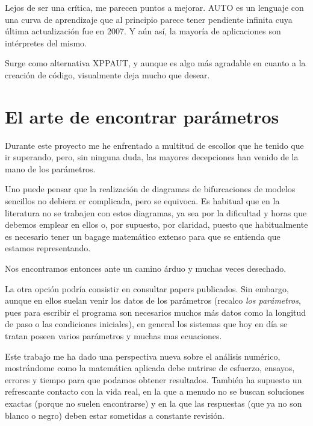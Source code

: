 Lejos de ser una crítica, me parecen puntos a mejorar. AUTO es un lenguaje con una curva de aprendizaje que al principio parece tener pendiente infinita cuya última actualización fue en 2007. Y aún así, la mayoría de aplicaciones son intérpretes del mismo.

Surge como alternativa XPPAUT, y aunque es algo más agradable en cuanto a la creación de código, visualmente deja mucho que desear.


\section{El arte de encontrar parámetros}
Durante este proyecto me he enfrentado a multitud de escollos que he tenido que ir superando, pero, sin ninguna duda, las mayores decepciones han venido de la mano de los parámetros.

Uno puede pensar que la realización de diagramas de bifurcaciones de modelos sencillos no debiera er complicada, pero se equivoca. Es habitual que en la literatura no se trabajen con estos diagramas, ya sea por la dificultad y horas que debemos emplear en ellos o, por supuesto, por claridad, puesto que habitualmente es necesario tener un bagage matemático extenso para que se entienda que estamos representando. 

Nos encontramos entonces ante un camino árduo y muchas veces desechado.

La otra opción podría consistir en consultar papers publicados. Sin embargo, aunque en ellos suelan venir los datos de los parámetros (recalco \emph{los parámetros}, pues para escribir el programa son necesarios muchos más datos como la longitud de paso o las condiciones iniciales), en general los sistemas que hoy en día se tratan poseen varios parámetros y muchas mas ecuaciones.

Este trabajo me ha dado una perspectiva nueva sobre el análisis numérico, mostrándome como la matemática aplicada debe nutrirse de esfuerzo, ensayos, errores y tiempo para que podamos obtener resultados. También ha supuesto un refrescante contacto con la vida real, en la que a menudo no se buscan soluciones exactas (porque no suelen encontrarse) y en la que las respuestas (que ya no son blanco o negro) deben estar sometidas a constante revisión.



